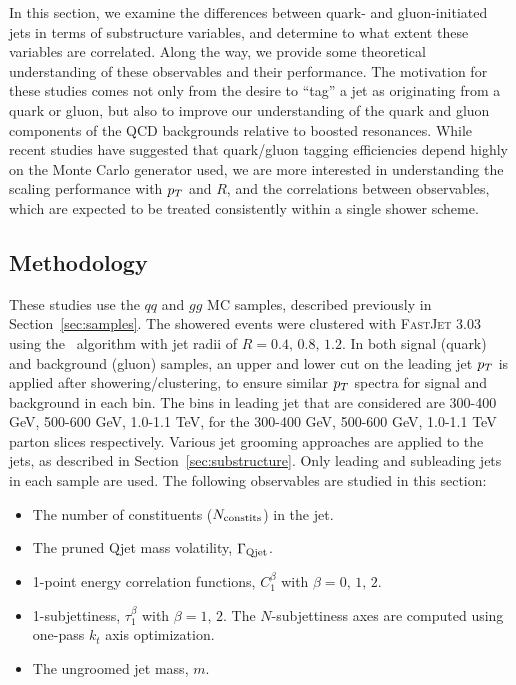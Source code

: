In this section, we examine the differences between quark- and
gluon-initiated jets in terms of substructure variables, and determine to what extent these variables are correlated. Along the
way, we provide some theoretical understanding of these
observables and their performance. The motivation for these studies
 comes not only from the
desire to ``tag'' a jet as originating from a quark or gluon, but also
to improve our  understanding of the quark and gluon components of the
QCD backgrounds relative to boosted resonances.  While recent studies
have suggested that quark/gluon tagging efficiencies depend highly on
the Monte Carlo generator used\cite{Aad:2014gea,Gallicchio:2012ez}, we are more interested in
understanding the scaling performance with $p_T$ and $R$, and the
correlations between observables, which are expected to be treated
consistently within a single shower scheme.

\subsection{Methodology}

These studies use the $qq$ and $gg$ MC samples, described previously in Section~\ref{sec:samples}. 
The showered events were clustered with \textsc{FastJet}
3.03 using
the \antikt~algorithm with jet radii of $R = 0.4,\, 0.8,\, 1.2$. In
both signal (quark) and background (gluon) samples, an upper and lower cut on
the leading jet $p_T$ is applied after showering/clustering, to ensure
similar $p_T$ spectra for signal and background in each \pt bin. The bins
in leading jet \pt that are considered are 300-400 GeV, 500-600 GeV,
1.0-1.1 TeV, for the 300-400 GeV, 500-600 GeV,
1.0-1.1 TeV parton \pt slices respectively. 
Various jet grooming approaches are applied to the jets, as described in Section~\ref{sec:substructure}. 
Only leading and subleading jets in each sample are used. The
following observables are studied in this section:

\begin{itemize}
\item The number of constituents ($N_{\rm constits}$) in the jet.
\item The pruned Qjet mass volatility, $\Gamma_{\rm Qjet}$.
\item 1-point energy correlation functions, $C_1^{\beta}$ with $\beta=0,\,1,\,2$.
\item 1-subjettiness, $\tau_1^{\beta}$ with $\beta=1,\,2$. The $N$-subjettiness axes are computed using one-pass $k_t$ axis optimization.
\item The ungroomed jet mass,  $m$.
\end{itemize}

